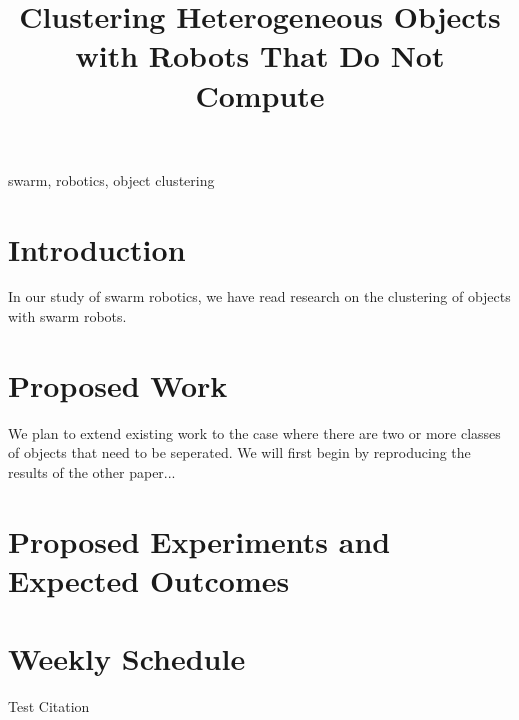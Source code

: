 \documentclass[conference]{IEEEtran}
\begin{document}
\title{Clustering Heterogeneous Objects with Robots That Do Not Compute}

\author{
\and
{}
\and
{}
}

\maketitle

\begin{abstract}
\end{abstract}

\begin{IEEEkeywords}
  swarm, robotics, object clustering
\end{IEEEkeywords}

\section{Introduction}
In our study of swarm robotics, we have read research on the clustering of objects with swarm robots.

\section{Proposed Work}
We plan to extend existing work to the case where there are two or more classes of objects that need to be seperated. We will first begin by reproducing the results of the other paper...

\section{Proposed Experiments and Expected Outcomes}

\section{Weekly Schedule}
Test Citation \cite{salek2013hotspotting}



\end{document}
